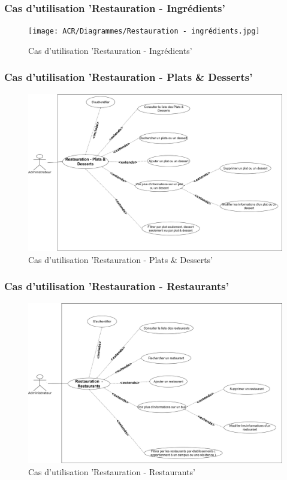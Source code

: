 \subsubsection*{Cas d'utilisation 'Restauration - Ingrédients'}
\begin{figure}[H]
    \centering
    \texttt{[image: ACR/Diagrammes/Restauration - ingrédients.jpg]}
    \caption{Cas d'utilisation 'Restauration - Ingrédients'}
\end{figure}

\subsubsection*{Cas d'utilisation 'Restauration - Plats \& Desserts'}
\begin{figure}[H]
    \centering
    \includegraphics[scale=0.1]{ACR/Diagrammes/Restauration - Plats&Desserts.jpg}
    \caption{Cas d'utilisation 'Restauration - Plats \& Desserts'}
\end{figure}

\subsubsection*{Cas d'utilisation 'Restauration - Restaurants'}
\begin{figure}[H]
    \centering
    \includegraphics[scale=0.1]{ACR/Diagrammes/Restauration - restaurants.jpg}
    \caption{Cas d'utilisation 'Restauration - Restaurants'}
\end{figure}

